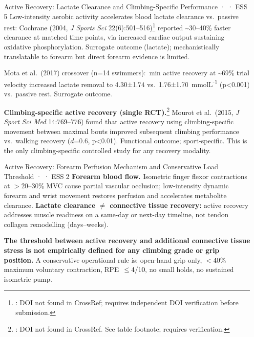 \begin{evidencebox}{Active Recovery: Lactate Clearance and Climbing-Specific Performance · \evidencebacked · ESS 5}
Low-intensity aerobic activity accelerates blood lactate clearance vs.\ passive rest: Cochrane (2004, \emph{J Sports Sci} 22(6):501--516)\footnote{\toverify: DOI not found in CrossRef; requires independent DOI verification before submission.} reported \textasciitilde{}30--40\% faster clearance at matched time points, via increased cardiac output sustaining oxidative phosphorylation. Surrogate outcome (lactate); mechanistically translatable to forearm but direct forearm evidence is limited.

Mota et al.\ (2017) crossover (n=14 swimmers):~min active recovery at \textasciitilde{}69\% trial velocity increased lactate removal to 4.30$\pm$1.74 vs.\ 1.76$\pm$1.70~mmol\textperiodcentered{}L\textsuperscript{-1} (p<0.001) vs.\ passive rest. Surrogate outcome. \cite{MDOS+17}

\textbf{Climbing-specific active recovery (single RCT).}\footnote{\toverify: DOI not found in CrossRef. See table footnote; requires verification.} Mourot et al.\ (2015, \emph{J Sport Sci Med} 14:769--776) found that active recovery using climbing-specific movement between maximal bouts improved subsequent climbing performance vs.\ walking recovery ($d$=0.6, p<0.01). Functional outcome; sport-specific. This is the only climbing-specific controlled study for any recovery modality.
\end{evidencebox}

\begin{bioplausbox}{Active Recovery: Forearm Perfusion Mechanism and Conservative Load Threshold · \bioplausible · ESS 2}
\textbf{Forearm blood flow.} Isometric finger flexor contractions at $>$20--30\% MVC cause partial vascular occlusion; low-intensity dynamic forearm and wrist movement restores perfusion and accelerates metabolite clearance. \textbf{Lactate clearance $\neq$ connective tissue recovery:} active recovery addresses muscle readiness on a same-day or next-day timeline, not tendon collagen remodelling (days--weeks).

\textbf{The threshold between active recovery and additional connective tissue stress is not empirically defined for any climbing grade or grip position.} A conservative operational rule is: open-hand grip only, $<$40\% maximum voluntary contraction, RPE~$\leq$4/10, no small holds, no sustained isometric pump.
\end{bioplausbox}

